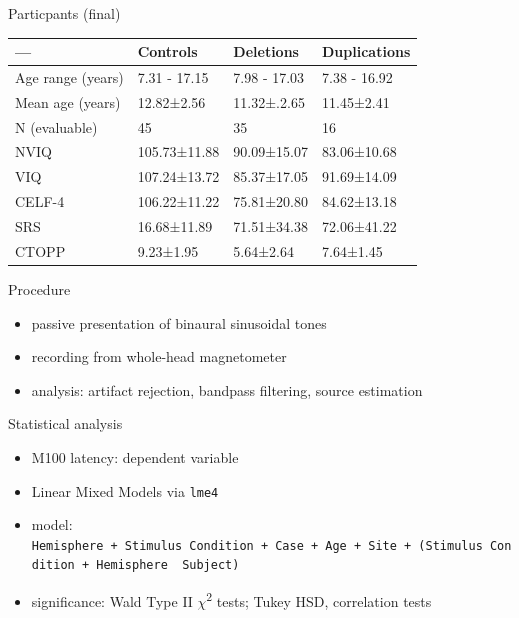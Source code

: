 \begin{frame}{Particpants (final)}

\begin{longtable}[c]{@{}llll@{}}
\toprule
--- & Controls & Deletions & Duplications\tabularnewline
\midrule
\endhead
Age range (years) & 7.31 - 17.15 & 7.98 - 17.03 & 7.38 -
16.92\tabularnewline
Mean age (years) & 12.82±2.56 & 11.32±.2.65 & 11.45±2.41\tabularnewline
N (evaluable) & 45 & 35 & 16\tabularnewline
NVIQ & 105.73±11.88 & 90.09±15.07 & 83.06±10.68\tabularnewline
VIQ & 107.24±13.72 & 85.37±17.05 & 91.69±14.09\tabularnewline
CELF-4 & 106.22±11.22 & 75.81±20.80 & 84.62±13.18\tabularnewline
SRS & 16.68±11.89 & 71.51±34.38 & 72.06±41.22\tabularnewline
CTOPP & 9.23±1.95 & 5.64±2.64 & 7.64±1.45\tabularnewline
\bottomrule
\end{longtable}

\end{frame}

\begin{frame}{Procedure}

\begin{itemize}
\itemsep1pt\parskip0pt
\item
  passive presentation of binaural sinusoidal tones\\
\item
  recording from whole-head magnetometer\\
\item
  analysis: artifact rejection, bandpass filtering, source estimation
\end{itemize}

\end{frame}

\begin{frame}{Statistical analysis}

\begin{itemize}
\itemsep1pt\parskip0pt
\item
  M100 latency: dependent variable\\
\item
  Linear Mixed Models via \texttt{lme4}\\
\item
  model:
  \texttt{Hemisphere\ +\ Stimulus\ Condition\ +\ Case\ +\ Age\ +\ Site\ +\ (Stimulus\ Condition\ +\ Hemisphere\ \textbar{}\ Subject)}\\
\item
  significance: Wald Type II \(\chi\)\textsuperscript{2} tests; Tukey
  HSD, correlation tests
\end{itemize}

\end{frame}

